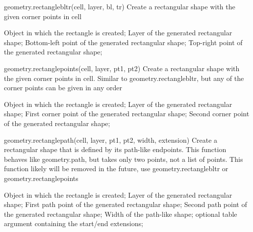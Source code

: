 \begin{APIfunc}{geometry.rectanglebltr(cell, layer, bl, tr)}
    Create a rectangular shape with the given corner points in cell
    \begin{APIparameters}
            Object in which the rectangle is created;
            Layer of the generated rectangular shape;
            Bottom-left point of the generated rectangular shape;
            Top-right point of the generated rectangular shape;
    \end{APIparameters}
\end{APIfunc}
\begin{APIfunc}{geometry.rectanglepoints(cell, layer, pt1, pt2)}
    Create a rectangular shape with the given corner points in cell. Similar to geometry.rectanglebltr, but any of the corner points can be given in any order
    \begin{APIparameters}
            Object in which the rectangle is created;
            Layer of the generated rectangular shape;
            First corner point of the generated rectangular shape;
            Second corner point of the generated rectangular shape;
    \end{APIparameters}
\end{APIfunc}
\begin{APIfunc}{geometry.rectanglepath(cell, layer, pt1, pt2, width, extension)}
    Create a rectangular shape that is defined by its path-like endpoints. This function behaves like geometry.path, but takes only two points, not a list of points. This function likely will be removed in the future, use geometry.rectanglebltr or geometry.rectanglepoints
    \begin{APIparameters}
            Object in which the rectangle is created;
            Layer of the generated rectangular shape;
            First path point of the generated rectangular shape;
            Second path point of the generated rectangular shape;
            Width of the path-like shape;
            optional table argument containing the start/end extensions;
    \end{APIparameters}
\end{APIfunc}
